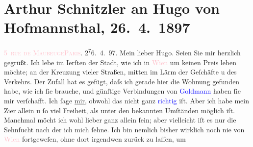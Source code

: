 

               \section[Arthur Schnitzler an Hugo von Hofmannsthal, 26. 4. 1897]{ Arthur Schnitzler an Hugo von Hofmannsthal, 26. 4. 1897}\nopagebreak{}\rehead{ }\normalsize\beginnumbering{} \toendnotes[C]{\smallbreak\pagebreak[2]} 
\toendnotes[C]{\smallbreak}\pstart
           \raggedleft{}{\pb}\textcolor{pink}{5 \textsc{rue \introOben{}de\introOben{} Maubeuge}}{}\ledrightnote{\textcolor{pink}{rue de Maubeuge}}{\\}\textcolor{pink}{\textsc{Paris}}{}\ledrightnote{\textcolor{pink}{Paris}}. 2\substVorne{}\textsuperscript{7}\substDazwischen{}6\substHinten{}. 4. 97.\pend
           \pstart
           Mein lieber Hugo. Seien Sie mir herzlich gegrüßt. Ich lebe im
                        I{\geminationn}erſten der Stadt, wie ich in \textcolor{pink}{Wien}{}\ledrightnote{\textcolor{pink}{Wien}} um keinen Preis leben möchte; an der Kreuzung vieler
                    Straßen, mitten im Lärm der Geſchäfte u des Verkehrs. Der Zufall hat es gefügt,
                    daſs ich gerade hier die Wohnung gefunden habe, wie ich ſie brauche, und
                    günſtige Verbindungen von \textcolor{blue}{Goldmann}{}\ledrightnote{\textcolor{blue}{Paul Goldmann}} haben ſie
                    mir verſchafft. Ich ſage \uline{mir}, obwohl das nicht
                    ganz \textcolor{blue}{richtig}{} iſt. Aber ich habe mein Zi{\geminationm}er allein u ſo viel Freiheit, als unter
                    den bekannten Umſtänden möglich iſt. Manchmal möcht ich wohl lieber ganz allein
                    ſein; aber vielleicht iſt {\pb}es nur die Sehnſucht nach
                    der ich mich ſehne. Ich bin nemlich bisher wirklich noch nie von \textcolor{pink}{Wien}{}\ledrightnote{\textcolor{pink}{Wien}} fortgeweſen, ohne dort irgendwen zurück zu laſſen, um
